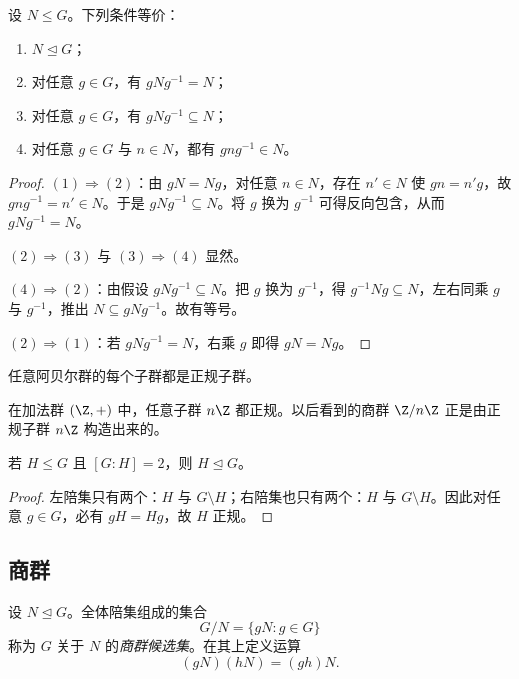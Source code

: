 \begin{proposition}[正规性的等价刻画]
设 $N\le G$。下列条件等价：
\begin{enumerate}[label=\textnormal{(\arabic*)}, leftmargin=3em]
  \item $N\trianglelefteq G$；
  \item 对任意 $g\in G$，有 $gNg^{-1}=N$；
  \item 对任意 $g\in G$，有 $gNg^{-1}\subseteq N$；
  \item 对任意 $g\in G$ 与 $n\in N$，都有 $gng^{-1}\in N$。
\end{enumerate}
\end{proposition}

\begin{proof}
$(1)\Rightarrow(2)$：由 $gN=Ng$，对任意 $n\in N$，存在 $n'\in N$ 使 $gn=n'g$，故 $gng^{-1}=n'\in N$。于是 $gNg^{-1}\subseteq N$。将 $g$ 换为 $g^{-1}$ 可得反向包含，从而 $gNg^{-1}=N$。

$(2)\Rightarrow(3)$ 与 $(3)\Rightarrow(4)$ 显然。

$(4)\Rightarrow(2)$：由假设 $gNg^{-1}\subseteq N$。把 $g$ 换为 $g^{-1}$，得 $g^{-1}Ng\subseteq N$，左右同乘 $g$ 与 $g^{-1}$，推出 $N\subseteq gNg^{-1}$。故有等号。

$(2)\Rightarrow(1)$：若 $gNg^{-1}=N$，右乘 $g$ 即得 $gN=Ng$。
\end{proof}

\begin{example}
任意阿贝尔群的每个子群都是正规子群。
\end{example}

\begin{example}
在加法群 $(\Z,+)$ 中，任意子群 $n\Z$ 都正规。以后看到的商群 $\Z/n\Z$ 正是由正规子群 $n\Z$ 构造出来的。
\end{example}

\begin{proposition}
若 $H\le G$ 且 $[G:H]=2$，则 $H\trianglelefteq G$。
\end{proposition}

\begin{proof}
左陪集只有两个：$H$ 与 $G\setminus H$；右陪集也只有两个：$H$ 与 $G\setminus H$。因此对任意 $g\in G$，必有 $gH=Hg$，故 $H$ 正规。
\end{proof}

\subsection*{商群}

\begin{definition}
设 $N\trianglelefteq G$。全体陪集组成的集合
\[
 G/N=\{gN:g\in G\}
\]
称为 $G$ 关于 $N$ 的\emph{商群候选集}。在其上定义运算
\[
 (gN)(hN)=(gh)N.
\]
\end{definition}

